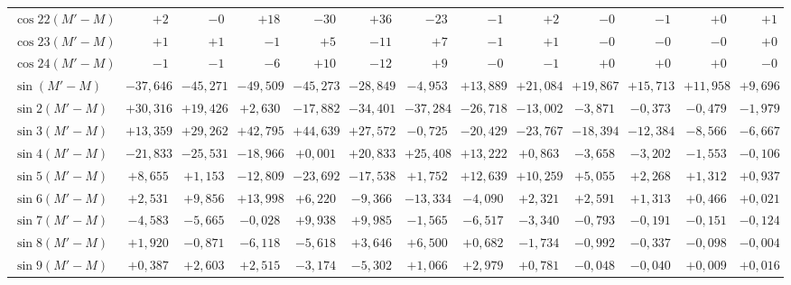 \begin{landscape}
\begin{longtable}{@{}l|r|r|r|r|r|r|r|r|r|r|r|r@{}}
\(\cos 22(M'-M)\) & \(+2\) & \(-0\) & \(+18\) & \(-30\) & \(+36\) & \(-23\) & \(-1\) & \(+2\) & \(-0\) & \(-1\) & \(+0\) & \(+1\)\\
\(\cos 23(M'-M)\) & \(+1\) & \(+1\) & \(-1\) & \(+5\) & \(-11\) & \(+7\) & \(-1\) & \(+1\) & \(-0\) & \(-0\) & \(-0\) & \(+0\)\\
\(\cos 24(M'-M)\) & \(-1\) & \(-1\) & \(-6\) & \(+10\) & \(-12\) & \(+9\) & \(-0\) & \(-1\) & \(+0\) & \(+0\) & \(+0\) & \(-0\)\\[6pt]
\(\sin(M'-M)\) & \(-37{,}646\) & \(-45{,}271\) & \(-49{,}509\) & \(-45{,}273\) & \(-28{,}849\) & \(-4{,}953\) & \(+13{,}889\) & \(+21{,}084\) & \(+19{,}867\) & \(+15{,}713\) & \(+11{,}958\) & \(+9{,}696\)\\
\(\sin 2(M'-M)\) & \(+30{,}316\) & \(+19{,}426\) & \(+2{,}630\) & \(-17{,}882\) & \(-34{,}401\) & \(-37{,}284\) & \(-26{,}718\) & \(-13{,}002\) & \(-3{,}871\) & \(-0{,}373\) & \(-0{,}479\) & \(-1{,}979\)\\
\(\sin 3(M'-M)\) & \(+13{,}359\) & \(+29{,}262\) & \(+42{,}795\) & \(+44{,}639\) & \(+27{,}572\) & \(-0{,}725\) & \(-20{,}429\) & \(-23{,}767\) & \(-18{,}394\) & \(-12{,}384\) & \(-8{,}566\) & \(-6{,}667\)\\
\(\sin 4(M'-M)\) & \(-21{,}833\) & \(-25{,}531\) & \(-18{,}966\) & \(+0{,}001\) & \(+20{,}833\) & \(+25{,}408\) & \(+13{,}222\) & \(+0{,}863\) & \(-3{,}658\) & \(-3{,}202\) & \(-1{,}553\) & \(-0{,}106\)\\
\(\sin 5(M'-M)\) & \(+8{,}655\) & \(+1{,}153\) & \(-12{,}809\) & \(-23{,}692\) & \(-17{,}538\) & \(+1{,}752\) & \(+12{,}639\) & \(+10{,}259\) & \(+5{,}055\) & \(+2{,}268\) & \(+1{,}312\) & \(+0{,}937\)\\
\(\sin 6(M'-M)\) & \(+2{,}531\) & \(+9{,}856\) & \(+13{,}998\) & \(+6{,}220\) & \(-9{,}366\) & \(-13{,}334\) & \(-4{,}090\) & \(+2{,}321\) & \(+2{,}591\) & \(+1{,}313\) & \(+0{,}466\) & \(+0{,}021\)\\
\(\sin 7(M'-M)\) & \(-4{,}583\) & \(-5{,}665\) & \(-0{,}028\) & \(+9{,}938\) & \(+9{,}985\) & \(-1{,}565\) & \(-6{,}517\) & \(-3{,}340\) & \(-0{,}793\) & \(-0{,}191\) & \(-0{,}151\) & \(-0{,}124\)\\
\(\sin 8(M'-M)\) & \(+1{,}920\) & \(-0{,}871\) & \(-6{,}118\) & \(-5{,}618\) & \(+3{,}646\) & \(+6{,}500\) & \(+0{,}682\) & \(-1{,}734\) & \(-0{,}992\) & \(-0{,}337\) & \(-0{,}098\) & \(-0{,}004\)\\
\(\sin 9(M'-M)\) & \(+0{,}387\) & \(+2{,}603\) & \(+2{,}515\) & \(-3{,}174\) & \(-5{,}302\) & \(+1{,}066\) & \(+2{,}979\) & \(+0{,}781\) & \(-0{,}048\) & \(-0{,}040\) & \(+0{,}009\) & \(+0{,}016\)\\

\end{longtable}
\end{landscape}
